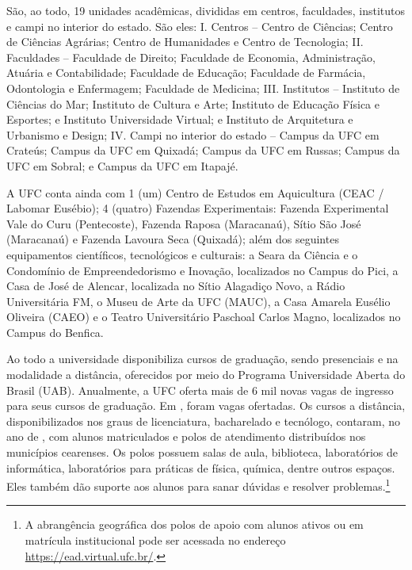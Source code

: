 São, ao todo, 19 unidades acadêmicas, divididas em centros, faculdades, institutos e campi no interior do estado. São eles: I. Centros – Centro de Ciências; Centro de Ciências Agrárias; Centro de Humanidades e Centro de Tecnologia; II. Faculdades – Faculdade de Direito; Faculdade de Economia, Administração, Atuária e Contabilidade; Faculdade de Educação; Faculdade de Farmácia, Odontologia e Enfermagem; Faculdade de Medicina; III. Institutos – Instituto de Ciências do Mar; Instituto de Cultura e Arte; Instituto de Educação Física e Esportes; e Instituto Universidade Virtual; e Instituto de Arquitetura e Urbanismo e Design; IV. Campi no interior do estado – Campus da UFC em Crateús; Campus da UFC em Quixadá; Campus da UFC em Russas; Campus da UFC em Sobral; e Campus da UFC em Itapajé.

A UFC conta ainda com 1 (um) Centro de Estudos em Aquicultura (CEAC / Labomar Eusébio); 4 (quatro) Fazendas Experimentais: Fazenda Experimental Vale do Curu (Pentecoste), Fazenda Raposa (Maracanaú), Sítio São José (Maracanaú) e Fazenda Lavoura Seca (Quixadá); além dos seguintes equipamentos científicos, tecnológicos e culturais: a Seara da Ciência e o Condomínio de Empreendedorismo e Inovação, localizados no Campus do Pici, a Casa de José de Alencar, localizada no Sítio Alagadiço Novo, a Rádio Universitária FM, o Museu de Arte da UFC (MAUC), a Casa Amarela Eusélio Oliveira (CAEO) e o Teatro Universitário Paschoal Carlos Magno, localizados no Campus do Benfica.

Ao todo a universidade disponibiliza \ufcCurGraduacao cursos de graduação, sendo \ufcCurGradPresencial presenciais e \ufcCurGradEAD na modalidade a distância, oferecidos por meio do Programa Universidade Aberta do Brasil (UAB). Anualmente, a UFC oferta mais de 6 mil novas vagas de ingresso para seus cursos de graduação. Em \ufcAnoReferencia, foram \ufcVagasGrad vagas ofertadas. Os cursos a distância, disponibilizados nos graus de licenciatura, bacharelado e tecnólogo, contaram, no ano de \ufcAnoReferencia, com \ufcMatriculasEAD alunos matriculados e \ufcPolosEAD polos de atendimento distribuídos nos municípios cearenses. Os polos possuem salas de aula, biblioteca, laboratórios de informática, laboratórios para práticas de física, química, dentre outros espaços. Eles também dão suporte aos alunos para sanar dúvidas e resolver problemas.\footnote{A abrangência geográfica dos polos de apoio com alunos ativos ou em matrícula institucional pode ser acessada no endereço \url{https://ead.virtual.ufc.br/}.}

